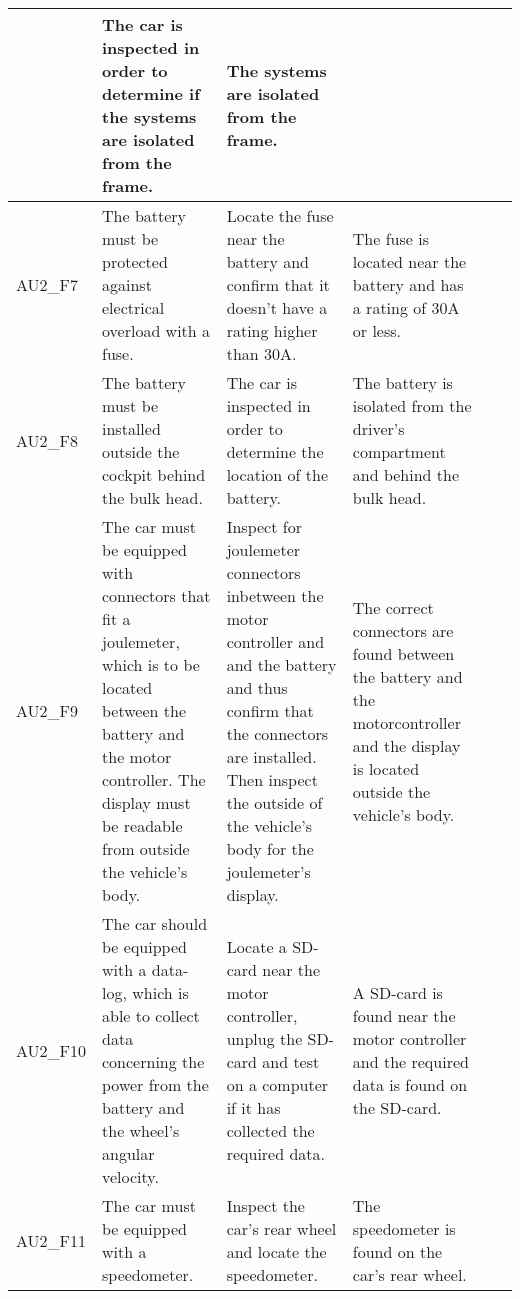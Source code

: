 \begin{longtable}{|p{1.6 cm}|p{2.9 cm}|p{2.9 cm}|p{1.9 cm}|p{1.8 cm}|p{1.8 cm}|}
	& The car is inspected in order to determine if the systems are isolated from the frame.
	& The systems are isolated from the frame.
	& 
	& \\ \hline
	AU2\_F7 
	& The battery must be protected against electrical overload with a fuse.
	& Locate the fuse near the battery and confirm that it doesn't have a rating higher than 30A. 
	& The fuse is located near the battery and has a rating of 30A or less. 
	& 
	& \\ \hline
	AU2\_F8 
	& The battery must be installed outside the cockpit behind the bulk head.
	& The car is inspected in order to determine the location of the battery.
	& The battery is isolated from the driver's compartment and behind the bulk head. 
	& 
	& \\ \hline
	AU2\_F9 
	& The car must be equipped with connectors that fit a joulemeter, which is to be located between the battery and the motor controller. The display must be readable from outside the vehicle's body.
	& Inspect for joulemeter connectors inbetween the motor controller and and the battery and thus confirm that the connectors are installed. Then inspect the outside of the vehicle's body for the joulemeter's display.
	& The correct connectors are found between the battery and the motorcontroller and the display is located outside the vehicle's body.
	& 
	& \\ \hline
	AU2\_F10 
	& The car should be equipped with a data-log, which is able to collect data concerning the power from the battery and the wheel's angular velocity.
	& Locate a SD-card near the motor controller, unplug the SD-card and test on a computer if it has collected the required data.  
	& A SD-card is found near the motor controller and the required data is found on the SD-card.
	& 
	& \\ \hline
	AU2\_F11 
	& The car must be equipped with a speedometer.
	& Inspect the car's rear wheel and locate the speedometer.
	& The speedometer is found on the car's rear wheel. 
	& 
	& \\ \hline				
\end{longtable}